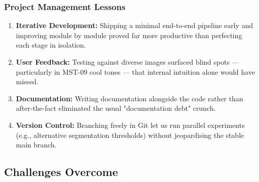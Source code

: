\subsubsection{Project Management Lessons}

\begin{enumerate}
    \item \textbf{Iterative Development:}
    Shipping a minimal end-to-end pipeline early and improving module by module proved far more productive than perfecting each stage in isolation.
    
    \item \textbf{User Feedback:}
    Testing against diverse images surfaced blind spots — particularly in MST-09 cool tones — that internal intuition alone would have missed.
    
    \item \textbf{Documentation:}
    Writing documentation alongside the code rather than after-the-fact eliminated the usual "documentation debt" crunch.
    
    \item \textbf{Version Control:}
    Branching freely in Git let us run parallel experiments (e.g., alternative segmentation thresholds) without jeopardising the stable main branch.
\end{enumerate}

\subsection{Challenges Overcome}

